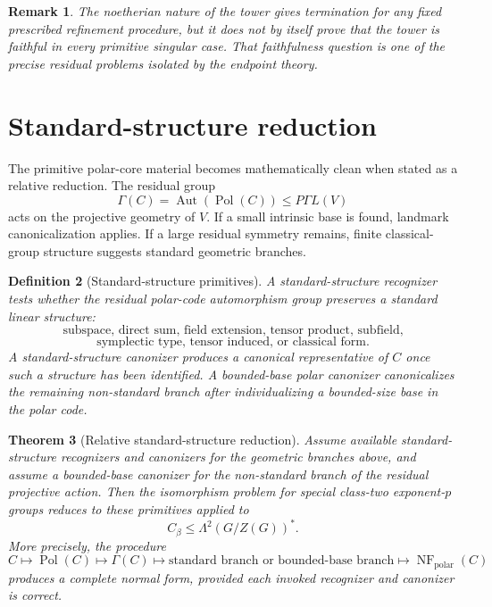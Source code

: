 \documentclass[11pt]{article}
\newtheorem{theorem}{Theorem}[section]
\newtheorem{definition}[theorem]{Definition}
\newtheorem{remark}[theorem]{Remark}
\begin{document}
\begin{remark}
The noetherian nature of the tower gives termination for any fixed prescribed refinement procedure, but it does not by itself prove that the tower is faithful in every primitive singular case. That faithfulness question is one of the precise residual problems isolated by the endpoint theory.
\end{remark}

\section{Standard-structure reduction}

The primitive polar-core material becomes mathematically clean when stated as a relative reduction. The residual group
\[
\Gamma(C)=\operatorname{Aut}(\operatorname{Pol}(C))
\le P\Gamma L(V)
\]
acts on the projective geometry of $V$. If a small intrinsic base is found, landmark canonicalization applies. If a large residual symmetry remains, finite classical-group structure suggests standard geometric branches.

\begin{definition}[Standard-structure primitives]
A standard-structure recognizer tests whether the residual polar-code automorphism group preserves a standard linear structure:
\[
\text{subspace, direct sum, field extension, tensor product, subfield,}
\]
\[
\text{symplectic type, tensor induced, or classical form.}
\]
A standard-structure canonizer produces a canonical representative of $C$ once such a structure has been identified. A bounded-base polar canonizer canonicalizes the remaining non-standard branch after individualizing a bounded-size base in the polar code.
\end{definition}

\begin{theorem}[Relative standard-structure reduction]
Assume available standard-structure recognizers and canonizers for the geometric branches above, and assume a bounded-base canonizer for the non-standard branch of the residual projective action. Then the isomorphism problem for special class-two exponent-$p$ groups reduces to these primitives applied to
\[
C_\beta\le\Lambda^2(G/Z(G))^*.
\]
More precisely, the procedure
\[
C
\longmapsto
\operatorname{Pol}(C)
\longmapsto
\Gamma(C)
\longmapsto
\text{standard branch or bounded-base branch}
\longmapsto
\operatorname{NF}_{\mathrm{polar}}(C)
\]
produces a complete normal form, provided each invoked recognizer and canonizer is correct.
\end{theorem}
\end{document}
